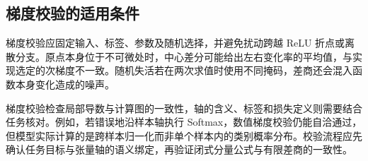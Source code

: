 \documentclass[../textbook.tex]{subfiles}
\begin{document}
\subsection{梯度校验的适用条件}
梯度校验应固定输入、标签、参数及随机选择，并避免扰动跨越 ReLU 折点或离散分支。原点本身位于不可微处时，中心差分可能给出左右变化率的平均值，与实现选定的次梯度不一致。随机失活若在两次求值时使用不同掩码，差商还会混入函数本身变化造成的噪声。

梯度校验检查局部导数与计算图的一致性，轴的含义、标签和损失定义则需要结合任务核对。例如，若错误地沿样本轴执行 Softmax，数值梯度校验仍能自洽通过，但模型实际计算的是跨样本归一化而非单个样本内的类别概率分布。校验流程应先确认任务目标与张量轴的语义绑定，再验证闭式分量公式与有限差商的一致性。






\chapterreferences
\myendchapterdocument
\end{document}
